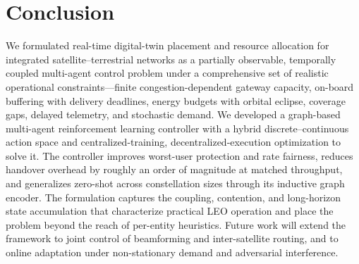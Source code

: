 \documentclass[11pt]{article}
\begin{document}
\section{Conclusion}
\label{sec:conclusion}

We formulated real-time digital-twin placement and resource allocation for
integrated satellite--terrestrial networks as a partially observable, temporally
coupled multi-agent control problem under a comprehensive set of realistic
operational constraints---finite congestion-dependent gateway capacity, on-board
buffering with delivery deadlines, energy budgets with orbital eclipse, coverage
gaps, delayed telemetry, and stochastic demand. We developed a graph-based
multi-agent reinforcement learning controller with a hybrid discrete--continuous
action space and centralized-training, decentralized-execution optimization to
solve it. The controller improves worst-user protection and rate fairness, reduces
handover overhead by roughly an order of magnitude at matched throughput, and
generalizes zero-shot across constellation sizes through its inductive graph
encoder. The formulation captures the coupling, contention, and long-horizon state
accumulation that characterize practical LEO operation and place the problem beyond
the reach of per-entity heuristics. Future work will extend the framework to joint
control of beamforming and inter-satellite routing, and to online adaptation under
non-stationary demand and adversarial interference.
\end{document}
